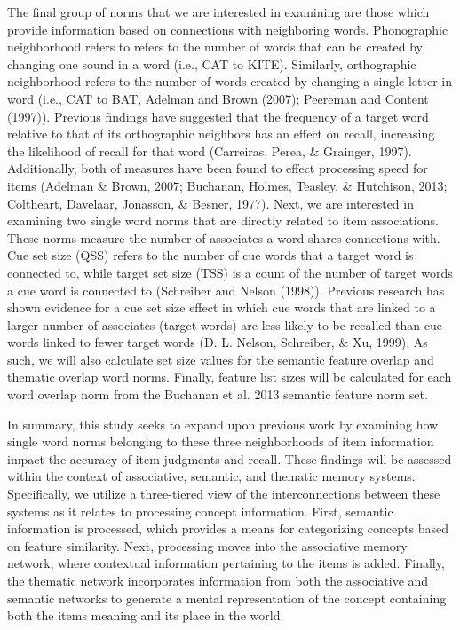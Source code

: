 \documentclass[english,man]{apa6}
\theoremstyle{definition}
\theoremstyle{definition}
\theoremstyle{remark}
\begin{document}
The final group of norms that we are interested in examining are those
which provide information based on connections with neighboring words.
Phonographic neighborhood refers to refers to the number of words that
can be created by changing one sound in a word (i.e., CAT to KITE).
Similarly, orthographic neighborhood refers to the number of words
created by changing a single letter in word (i.e., CAT to BAT, Adelman
and Brown (2007); Peereman and Content (1997)). Previous findings have
suggested that the frequency of a target word relative to that of its
orthographic neighbors has an effect on recall, increasing the
likelihood of recall for that word (Carreiras, Perea, \& Grainger,
1997). Additionally, both of measures have been found to effect
processing speed for items (Adelman \& Brown, 2007; Buchanan, Holmes,
Teasley, \& Hutchison, 2013; Coltheart, Davelaar, Jonasson, \& Besner,
1977). Next, we are interested in examining two single word norms that
are directly related to item associations. These norms measure the
number of associates a word shares connections with. Cue set size (QSS)
refers to the number of cue words that a target word is connected to,
while target set size (TSS) is a count of the number of target words a
cue word is connected to (Schreiber and Nelson (1998)). Previous
research has shown evidence for a cue set size effect in which cue words
that are linked to a larger number of associates (target words) are less
likely to be recalled than cue words linked to fewer target words (D. L.
Nelson, Schreiber, \& Xu, 1999). As such, we will also calculate set
size values for the semantic feature overlap and thematic overlap word
norms. Finally, feature list sizes will be calculated for each word
overlap norm from the Buchanan et al. 2013 semantic feature norm set.

In summary, this study seeks to expand upon previous work by examining
how single word norms belonging to these three neighborhoods of item
information impact the accuracy of item judgments and recall. These
findings will be assessed within the context of associative, semantic,
and thematic memory systems. Specifically, we utilize a three-tiered
view of the interconnections between these systems as it relates to
processing concept information. First, semantic information is
processed, which provides a means for categorizing concepts based on
feature similarity. Next, processing moves into the associative memory
network, where contextual information pertaining to the items is added.
Finally, the thematic network incorporates information from both the
associative and semantic networks to generate a mental representation of
the concept containing both the items meaning and its place in the
world.
\end{document}
